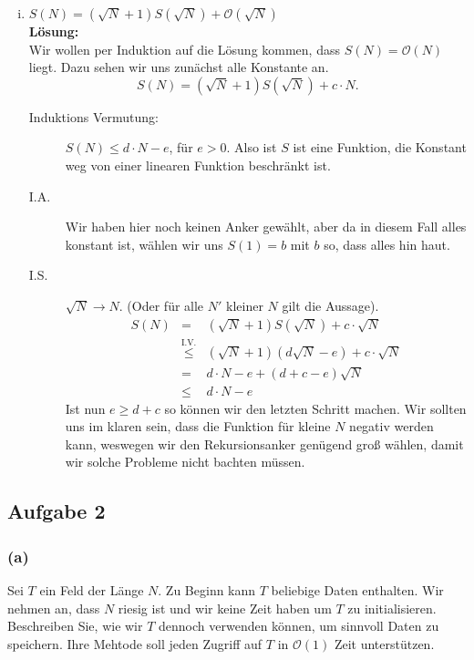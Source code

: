 \documentclass[11pt,a4paper,ngerman]{article}
\begin{document}
\begin{enumerate}[(i)]
	\item $S(N) = \left( \sqrt{N} + 1 \right) S( \sqrt{N}) + \mathcal{O}(\sqrt{N})$\\
	\noindent\textbf{Lösung:}\\
		Wir wollen per Induktion auf die Lösung kommen, dass $S(N) = \mathcal{O}(N)$ liegt. Dazu sehen wir uns zunächst alle Konstante
		an.
		$$
			S(N) = (\sqrt{N} + 1 ) S( \sqrt{N}) + c \cdot N.
		$$
		\begin{description}
			\item[Induktions Vermutung:] $S(N) \leq d \cdot N - e$, für $e > 0$. Also ist $S$ ist eine Funktion, die Konstant weg
			von einer linearen Funktion beschränkt ist.
			\item[I.A.] Wir haben hier noch keinen Anker gewählt, aber da in diesem Fall alles konstant ist, wählen wir uns
				$S(1) = b$ mit $b$ so, dass alles hin haut.
			\item[I.S.] $\sqrt{N} \rightarrow N$. (Oder für alle $N'$ kleiner $N$ gilt die Aussage).\\
				$$\begin{array}{rcl}
					S(N) &=& (\sqrt{N} + 1) S(\sqrt{N}) + c \cdot \sqrt{N}\\
						&\stackrel{\text{I.V.}}{\leq}& (\sqrt{N} + 1) (d \sqrt{N} - e) + c \cdot \sqrt{N}\\
						&=& d \cdot N - e + (d + c - e) \sqrt{N}\\
						&\leq& d \cdot N - e
				\end{array}$$
				Ist nun $e \geq d +c$ so können wir den letzten Schritt machen. Wir sollten uns im klaren sein,
				dass die Funktion für kleine $N$ negativ werden kann, weswegen wir den Rekursionsanker genügend groß
				wählen, damit wir solche Probleme nicht bachten müssen.
		\end{description}
\end{enumerate}

\subsection*{Aufgabe 2}

\subsubsection*{(a)}
Sei $T$ ein Feld der Länge $N$. Zu Beginn kann $T$ beliebige Daten enthalten. Wir nehmen an, dass $N$ riesig ist und wir keine Zeit haben um $T$ zu initialisieren. Beschreiben Sie, wie wir $T$ dennoch verwenden können, um sinnvoll Daten zu speichern. Ihre Mehtode soll jeden Zugriff auf $T$ in $\mathcal{O}(1)$ Zeit unterstützen.\\
\end{document}
